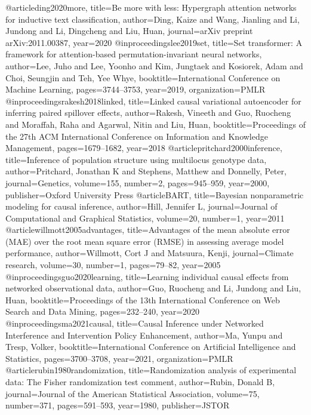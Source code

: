@article{ding2020more,
  title={Be more with less: Hypergraph attention networks for inductive text classification},
  author={Ding, Kaize and Wang, Jianling and Li, Jundong and Li, Dingcheng and Liu, Huan},
  journal={arXiv preprint arXiv:2011.00387},
  year={2020}
}
@inproceedings{lee2019set,
  title={Set transformer: A framework for attention-based permutation-invariant neural networks},
  author={Lee, Juho and Lee, Yoonho and Kim, Jungtaek and Kosiorek, Adam and Choi, Seungjin and Teh, Yee Whye},
  booktitle={International Conference on Machine Learning},
  pages={3744--3753},
  year={2019},
  organization={PMLR}
}
@inproceedings{rakesh2018linked,
  title={Linked causal variational autoencoder for inferring paired spillover effects},
  author={Rakesh, Vineeth and Guo, Ruocheng and Moraffah, Raha and Agarwal, Nitin and Liu, Huan},
  booktitle={Proceedings of the 27th ACM International Conference on Information and Knowledge Management},
  pages={1679--1682},
  year={2018}
}
@article{pritchard2000inference,
  title={Inference of population structure using multilocus genotype data},
  author={Pritchard, Jonathan K and Stephens, Matthew and Donnelly, Peter},
  journal={Genetics},
  volume={155},
  number={2},
  pages={945--959},
  year={2000},
  publisher={Oxford University Press}
}
@article{BART,
  title={Bayesian nonparametric modeling for causal inference},
  author={Hill, Jennifer L},
  journal={Journal of Computational and Graphical Statistics},
  volume={20},
  number={1},
  year={2011}
}
@article{willmott2005advantages,
  title={Advantages of the mean absolute error (MAE) over the root mean square error (RMSE) in assessing average model performance},
  author={Willmott, Cort J and Matsuura, Kenji},
  journal={Climate research},
  volume={30},
  number={1},
  pages={79--82},
  year={2005}
}
@inproceedings{guo2020learning,
  title={Learning individual causal effects from networked observational data},
  author={Guo, Ruocheng and Li, Jundong and Liu, Huan},
  booktitle={Proceedings of the 13th International Conference on Web Search and Data Mining},
  pages={232--240},
  year={2020}
}
@inproceedings{ma2021causal,
  title={Causal Inference under Networked Interference and Intervention Policy Enhancement},
  author={Ma, Yunpu and Tresp, Volker},
  booktitle={International Conference on Artificial Intelligence and Statistics},
  pages={3700--3708},
  year={2021},
  organization={PMLR}
}
@article{rubin1980randomization,
  title={Randomization analysis of experimental data: The Fisher randomization test comment},
  author={Rubin, Donald B},
  journal={Journal of the American Statistical Association},
  volume={75},
  number={371},
  pages={591--593},
  year={1980},
  publisher={JSTOR}
}
